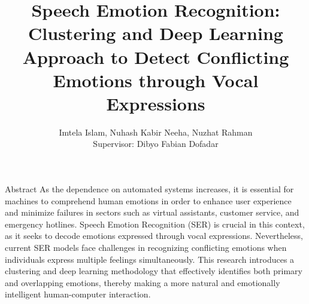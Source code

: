 \documentclass[final]{beamer}
\title{Speech Emotion Recognition: Clustering and Deep Learning Approach to Detect Conflicting Emotions through Vocal Expressions}
\author{Imtela Islam, Nuhash Kabir Neeha, Nuzhat Rahman \\ Supervisor: Dibyo Fabian Dofadar}
\begin{document}
\begin{frame}[t]

\begin{minipage}[t]{0.28\textwidth}
\begin{block}{Abstract}
As the dependence on automated systems increases, it is essential for machines to comprehend human emotions in order to enhance user experience and minimize failures in sectors such as virtual assistants, customer service, and emergency hotlines. Speech Emotion Recognition (SER) is crucial in this context, as it seeks to decode emotions expressed through vocal expressions. Nevertheless, current SER models face challenges in recognizing conflicting emotions when individuals express multiple feelings simultaneously. This research introduces a clustering and deep learning methodology that effectively identifies both primary and overlapping emotions, thereby making a more natural and emotionally intelligent human-computer interaction.

\end{block}


\end{minipage}
\end{frame}
\end{document}
